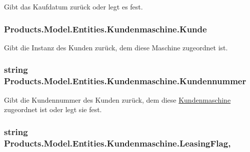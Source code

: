 Gibt das Kaufdatum zurück oder legt es fest. 

\subsubsection[{\texorpdfstring{Kunde}{Kunde}}]{ Products.\+Model.\+Entities.\+Kundenmaschine.\+Kunde\hspace{0.3cm}{\ttfamily [get]}}\hypertarget{class_products_1_1_model_1_1_entities_1_1_kundenmaschine_ac884bdb17fbb46dc0bc18f631e8cab1b}{}\label{class_products_1_1_model_1_1_entities_1_1_kundenmaschine_ac884bdb17fbb46dc0bc18f631e8cab1b}


Gibt die Instanz des Kunden zurück, dem diese Maschine zugeordnet ist. 

\subsubsection[{\texorpdfstring{Kundennummer}{Kundennummer}}]{\setlength{\rightskip}{0pt plus 5cm}string Products.\+Model.\+Entities.\+Kundenmaschine.\+Kundennummer\hspace{0.3cm}{\ttfamily [get]}}\hypertarget{class_products_1_1_model_1_1_entities_1_1_kundenmaschine_a46830408af92de452bec4435306d293e}{}\label{class_products_1_1_model_1_1_entities_1_1_kundenmaschine_a46830408af92de452bec4435306d293e}


Gibt die Kundennummer des Kunden zurück, dem diese \hyperlink{class_products_1_1_model_1_1_entities_1_1_kundenmaschine}{Kundenmaschine} zugeordnet ist oder legt sie fest. 

\subsubsection[{\texorpdfstring{Leasing\+Flag}{LeasingFlag}}]{\setlength{\rightskip}{0pt plus 5cm}string Products.\+Model.\+Entities.\+Kundenmaschine.\+Leasing\+Flag\hspace{0.3cm}{\ttfamily [get]}, {\ttfamily [set]}}\hypertarget{class_products_1_1_model_1_1_entities_1_1_kundenmaschine_a83e54251e847c609fd48ab26f996c9cb}{}\label{class_products_1_1_model_1_1_entities_1_1_kundenmaschine_a83e54251e847c609fd48ab26f996c9cb}


